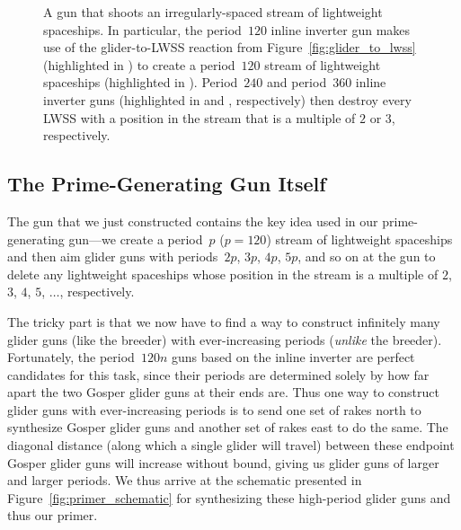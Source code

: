 \begin{figure}[!htb]
	\centering
	\caption{A gun that shoots an irregularly-spaced stream of lightweight spaceships. In particular, the period~$120$ inline inverter gun makes use of the glider-to-LWSS reaction from Figure~\ref{fig:glider_to_lwss} (highlighted in ) to create a period~$120$ stream of lightweight spaceships (highlighted in ). Period~$240$ and period~$360$ inline inverter guns (highlighted in  and , respectively) then destroy every LWSS with a position in the stream that is a multiple of $2$ or $3$, respectively.}
	\label{fig:period_not_2_3_lwss_gun}
\end{figure}


\subsection{The Prime-Generating Gun Itself}\label{sec:primer_itself}

The gun that we just constructed contains the key idea used in our prime-generating gun---we create a period~$p$ ($p = 120$) stream of lightweight spaceships and then aim glider guns with periods~$2p$, $3p$, $4p$, $5p$, and so on at the gun to delete any lightweight spaceships whose position in the stream is a multiple of $2$, $3$, $4$, $5$, $\ldots$, respectively.

The tricky part is that we now have to find a way to construct infinitely many glider guns (like the breeder) with ever-increasing periods (\emph{unlike} the breeder). Fortunately, the period~$120n$ guns based on the inline inverter are perfect candidates for this task, since their periods are determined solely by how far apart the two Gosper glider guns at their ends are. Thus one way to construct glider guns with ever-increasing periods is to send one set of rakes north to synthesize Gosper glider guns and another set of rakes east to do the same. The diagonal distance (along which a single glider will travel) between these endpoint Gosper glider guns will increase without bound, giving us glider guns of larger and larger periods. We thus arrive at the schematic presented in Figure~\ref{fig:primer_schematic} for synthesizing these high-period glider guns and thus our primer.

